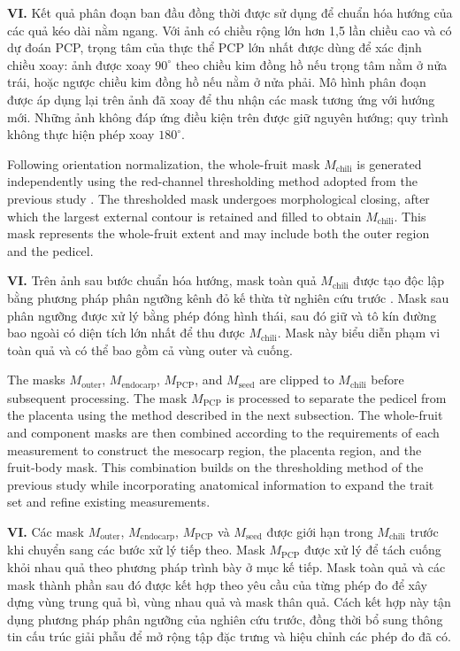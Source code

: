 \documentclass[final,1p,11pt,longtitle]{elsarticle}
\newenvironment{viet}{\par\smallskip\begingroup\color{viColor}\noindent\textbf{VI. }\ignorespaces}{\par\endgroup\smallskip}
\begin{document}
\begin{viet}
Kết quả phân đoạn ban đầu đồng thời được sử dụng để chuẩn hóa hướng của các quả kéo dài nằm ngang. Với ảnh có chiều rộng lớn hơn 1,5 lần chiều cao và có dự đoán PCP, trọng tâm của thực thể PCP lớn nhất được dùng để xác định chiều xoay: ảnh được xoay $90^{\circ}$ theo chiều kim đồng hồ nếu trọng tâm nằm ở nửa trái, hoặc ngược chiều kim đồng hồ nếu nằm ở nửa phải. Mô hình phân đoạn được áp dụng lại trên ảnh đã xoay để thu nhận các mask tương ứng với hướng mới. Những ảnh không đáp ứng điều kiện trên được giữ nguyên hướng; quy trình không thực hiện phép xoay $180^{\circ}$.
\end{viet}

Following orientation normalization, the whole-fruit mask $M_{\mathrm{chili}}$ is generated independently using the red-channel thresholding method adopted from the previous study \cite{ver1}. The thresholded mask undergoes morphological closing, after which the largest external contour is retained and filled to obtain $M_{\mathrm{chili}}$. This mask represents the whole-fruit extent and may include both the outer region and the pedicel.

\begin{viet}
Trên ảnh sau bước chuẩn hóa hướng, mask toàn quả $M_{\mathrm{chili}}$ được tạo độc lập bằng phương pháp phân ngưỡng kênh đỏ kế thừa từ nghiên cứu trước \cite{ver1}. Mask sau phân ngưỡng được xử lý bằng phép đóng hình thái, sau đó giữ và tô kín đường bao ngoài có diện tích lớn nhất để thu được $M_{\mathrm{chili}}$. Mask này biểu diễn phạm vi toàn quả và có thể bao gồm cả vùng outer và cuống.
\end{viet}

The masks $M_{\mathrm{outer}}$, $M_{\mathrm{endocarp}}$, $M_{\mathrm{PCP}}$, and $M_{\mathrm{seed}}$ are clipped to $M_{\mathrm{chili}}$ before subsequent processing. The mask $M_{\mathrm{PCP}}$ is processed to separate the pedicel from the placenta using the method described in the next subsection. The whole-fruit and component masks are then combined according to the requirements of each measurement to construct the mesocarp region, the placenta region, and the fruit-body mask. This combination builds on the thresholding method of the previous study while incorporating anatomical information to expand the trait set and refine existing measurements.

\begin{viet}
Các mask $M_{\mathrm{outer}}$, $M_{\mathrm{endocarp}}$, $M_{\mathrm{PCP}}$ và $M_{\mathrm{seed}}$ được giới hạn trong $M_{\mathrm{chili}}$ trước khi chuyển sang các bước xử lý tiếp theo. Mask $M_{\mathrm{PCP}}$ được xử lý để tách cuống khỏi nhau quả theo phương pháp trình bày ở mục kế tiếp. Mask toàn quả và các mask thành phần sau đó được kết hợp theo yêu cầu của từng phép đo để xây dựng vùng trung quả bì, vùng nhau quả và mask thân quả. Cách kết hợp này tận dụng phương pháp phân ngưỡng của nghiên cứu trước, đồng thời bổ sung thông tin cấu trúc giải phẫu để mở rộng tập đặc trưng và hiệu chỉnh các phép đo đã có.
\end{viet}
\end{document}
